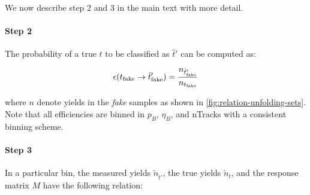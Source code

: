 We now describe step 2 and 3 in the main text with more detail.

\paragraph{Step 2} The probability of a true $t$ to be classified as $\hat{t}'$ can
be computed as:

\begin{equation}
    \misEff[t_\text{fake}]{\hat{t}'_\text{fake}} = \frac{n_{\hat{t}'_\text{fake}}}{n_{t_\text{fake}}}
\end{equation}

where $n$ denote yields in the \emph{fake} samples as shown
in \cref{fig:relation-unfolding-sets}.
Note that all efficiencies are binned in $p_B$, $\eta_B$, and nTracks with a
consistent binning scheme.


\paragraph{Step 3} In a particular bin, the measured
yields $\tilde{n}_{\hat{t}'}$, the true yields $\tilde{n}_{t}$, and the response matrix $M$
have the following relation:


